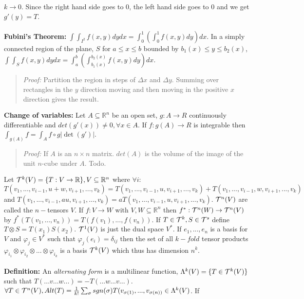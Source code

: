 $k \rightarrow 0$.  Since the right hand side goes to $0$, the left hand side goes to
$0$ and we get $g'(y)= T$.
\\
\\
{\bf Fubini's Theorem:}
$\int \int_{I^2} f(x,y) dy dx = \int_0^1 (\int_0^1 f(x,y) dy) dx$.  In
a simply connected region of the plane, $S$ for $a \leq x \leq b$ bounded by
$b_1(x) \leq y \leq b_2(x)$,
$\int \int_{S} f(x,y) dy dx = \int_a^b (\int_{b_1(x)}^{b_2(x)} f(x,y) dy) dx$.
\begin{quote}
\emph{Proof:}  Partition the region in steps of $\Delta x$ and $\Delta y$.  Summing over
rectangles in the $y$ direction moving and then moving in the positive $x$ direction gives the result.
\end{quote}
{\bf Change of variables:}
Let $A \subseteq {\mathbb R}^n$ be an open set, $g:A \rightarrow R$ 
continuously differentiable and
$det(g'(x)) \ne 0, \forall x \in A$.  If $f: g(A) \rightarrow R$ is integrable
then $\int_{g(A)} f = \int_A f \circ g |\det(g')|$.
\begin{quote}
\emph{Proof:} If $A$ is an $n \times n$ matrix. $det(A)$ is the volume of the 
image of the unit $n$-cube
under $A$.  Todo.
\end{quote}
Let ${\cal T}^k (V)= \{ T:V \rightarrow {\mathbb R} \}, V \subseteq 
{\mathbb R}^n $
where $\forall i$: 
$T(v_1, ..., v_{i-1}, u+w, v_{i+1},...,v_k)= T(v_1, ..., v_{i-1}, u, v_{i+1},...,v_k)+
T(v_1, ..., v_{i-1}, w, v_{i+1},...,v_k )$ and
$T(v_1, ..., v_{i-1}, au, v_{i+1},...,v_k)= aT(v_1, ..., v_{i-1}, u, v_{i+1},...,v_k)$.
${\cal T}^n(V)$ are called the $n-$tensors $V$.
If $f: V \rightarrow W$ with $V, W \subseteq {\mathbb R}^n$ then 
$f^*: {\cal T}^n (W) \rightarrow {\cal T}^n (V)$ by 
$f^* (T( v_1 , ... , v_n ))=
T(f(v_1) , ... , f(v_n ))$.
If $T \in {\cal T}^k, S \in {\cal T}^s$ define
$T \otimes S = T(x_1) S(x_2 )$.  ${\cal T}^1(V)$ is just the dual space $V^*$.
If $e_1 , ... , e_n$ is a basis for $V$ and
$\varphi_j \in V^*$ such that $\varphi_j (e_i)= \delta_{ij}$ then
the set of all $k-fold$ tensor products
$ \varphi_{i_1} \otimes  \varphi_{i_2}\otimes ... \otimes \varphi_{i_k}$ 
is a basis ${\cal T}^k(V)$
which thus has dimension $n^k$.  \\
\\
{\bf Definition:}
An \emph{alternating form} is a multilinear function,
$\Lambda^k(V)= \{T \in {\cal T}^k(V)\}$ such that $T(...v...w...)= -T(...w...v...)$.
$\forall T \in {\cal T}^n(V), Alt(T)= {\frac 1 {k!}} \sum_{\sigma} sgn(\sigma ) T(
v_{\sigma (1)},..., v_{\sigma (n))} 
\in \Lambda^k(V)$. If
